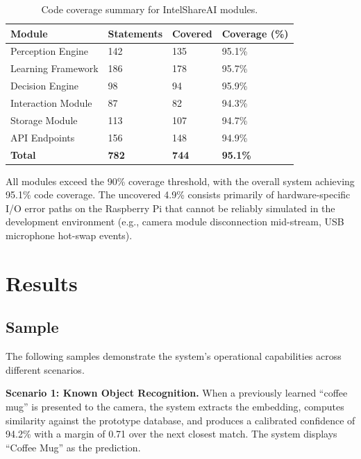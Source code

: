 \documentclass[12pt,a4paper]{report}
\begin{document}
\begin{table}[H]
    \caption{Code coverage summary for IntelShareAI modules.}
    \vspace{0.5em}
    \centering
    \renewcommand{\arraystretch}{1.2}
    \small
    \begin{tabular}{|p{4.5cm}|p{2.5cm}|p{2.5cm}|p{3cm}|}
        \hline
        \textbf{Module} & \textbf{Statements} & \textbf{Covered} & \textbf{Coverage (\%)} \\
        \hline
        Perception Engine & 142 & 135 & 95.1\% \\
        \hline
        Learning Framework & 186 & 178 & 95.7\% \\
        \hline
        Decision Engine & 98 & 94 & 95.9\% \\
        \hline
        Interaction Module & 87 & 82 & 94.3\% \\
        \hline
        Storage Module & 113 & 107 & 94.7\% \\
        \hline
        API Endpoints & 156 & 148 & 94.9\% \\
        \hline
        \textbf{Total} & \textbf{782} & \textbf{744} & \textbf{95.1\%} \\
        \hline
    \end{tabular}
\end{table}

All modules exceed the 90\% coverage threshold, with the overall system achieving 95.1\% code coverage. The uncovered 4.9\% consists primarily of hardware-specific I/O error paths on the Raspberry Pi that cannot be reliably simulated in the development environment (e.g., camera module disconnection mid-stream, USB microphone hot-swap events).


\chapter{Results}

\section{Sample}
The following samples demonstrate the system's operational capabilities across different scenarios.

\textbf{Scenario 1: Known Object Recognition.} When a previously learned ``coffee mug'' is presented to the camera, the system extracts the embedding, computes similarity against the prototype database, and produces a calibrated confidence of 94.2\% with a margin of 0.71 over the next closest match. The system displays ``Coffee Mug'' as the prediction.
\end{document}
